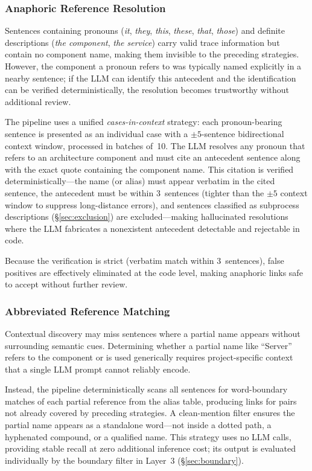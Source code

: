 \subsubsection{Anaphoric Reference Resolution}\label{sec:coref}

Sentences containing pronouns (\emph{it}, \emph{they}, \emph{this},
\emph{these}, \emph{that}, \emph{those}) and definite descriptions
(\emph{the component}, \emph{the service}) carry valid trace
information but contain no component name, making them invisible to
the preceding strategies.
However, the component a pronoun refers to was typically named
explicitly in a nearby sentence;
if the LLM can identify this antecedent and the identification
can be verified deterministically, the resolution becomes trustworthy
without additional review.

The pipeline uses a unified \emph{cases-in-context} strategy:
each pronoun-bearing sentence is presented as an individual case with
a $\pm5$-sentence bidirectional context window, processed in batches
of~10.
The LLM resolves any pronoun that refers to an architecture component
and must cite an antecedent sentence along with the exact quote
containing the component name.
This citation is verified deterministically---the name (or alias)
must appear verbatim in the cited sentence, the antecedent must be
within 3~sentences (tighter than the $\pm5$ context window
to suppress long-distance errors), and sentences classified as subprocess
descriptions (\S\ref{sec:exclusion}) are excluded---making
hallucinated resolutions where the LLM fabricates a nonexistent
antecedent detectable and rejectable in code.

Because the verification is strict (verbatim match within
3~sentences), false positives are effectively eliminated at the
code level, making anaphoric links safe to accept without further
review.

\subsubsection{Abbreviated Reference Matching}\label{sec:partial}

Contextual discovery may miss sentences where a partial name
appears without surrounding semantic cues.
Determining whether a partial name like ``Server'' refers to the
component or is used generically requires project-specific context
that a single LLM prompt cannot reliably encode.

Instead, the pipeline deterministically scans all sentences for
word-boundary matches of each partial reference from the alias table,
producing links for pairs not already covered by preceding strategies.
A clean-mention filter ensures the partial name appears as a
standalone word---not inside a dotted path, a hyphenated compound,
or a qualified name.
This strategy uses no LLM calls, providing stable recall at zero
additional inference cost;
its output is evaluated individually by the boundary filter in
Layer~3 (\S\ref{sec:boundary}).

